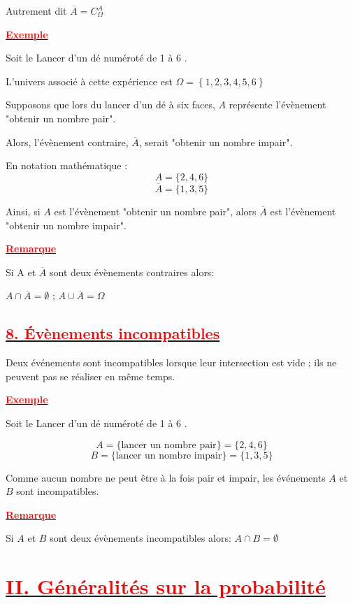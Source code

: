 \documentclass[12pt,a4paper]{article}
\begin{document}
Autrement dit $\overline{A}=C^{A}_{\Omega}$

\underline{\textbf{\textcolor{red}{Exemple}}}

Soit le Lancer d’un dé numéroté de 1 à 6 .

L’univers associé à cette expérience est $\Omega = \left\lbrace 1, 2, 3, 4, 5, 6 \right\rbrace $

Supposons que lors du lancer d'un dé à six faces, $A$ représente l'évènement "obtenir un nombre pair".

Alors, l'évènement contraire, $\overline{A}$, serait "obtenir un nombre impair".

En notation mathématique :
\[ A = \{2, 4, 6\} \]
\[ \overline{A} = \{1, 3, 5\} \]

Ainsi, si $A$ est l'évènement "obtenir un nombre pair", alors $\overline{A}$ est l'évènement "obtenir un nombre impair".

\underline{\textbf{\textcolor{red}{Remarque}}}

Si A et $\overline{A}$ sont deux évènements contraires alors:

$A\cap\overline{A}=\emptyset$ ; $A\cup\overline{A}=\Omega$

\subsection*{\underline{\textbf{\textcolor{red}{8. Évènements incompatibles}}}}

Deux événements sont incompatibles lorsque leur intersection est vide ; ils ne peuvent pas se réaliser en
même temps.

\underline{\textbf{\textcolor{red}{Exemple}}}

Soit le Lancer d’un dé numéroté de 1 à 6 .

\[ A = \{\text{lancer un nombre pair}\} = \{2, 4, 6\} \]
\[ B = \{\text{lancer un nombre impair}\} = \{1, 3, 5\} \]

Comme aucun nombre ne peut être à la fois pair et impair, les événements \(A\) et \(B\) sont incompatibles.

\underline{\textbf{\textcolor{red}{Remarque}}}

Si $A$ et $B$ sont deux évènements incompatibles alors: $A\cap B=\emptyset$ 

\section*{\underline{\textbf{\textcolor{red}{II. Généralités sur la probabilité}}}}
\end{document}
